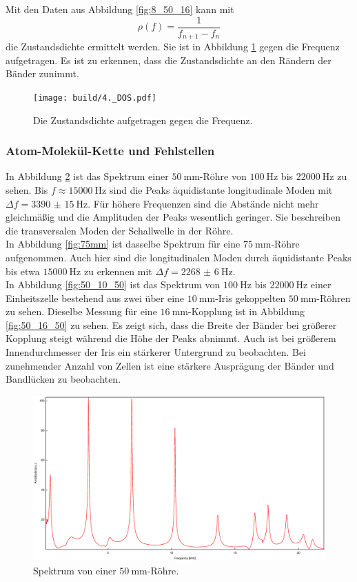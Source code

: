 \newpage
\noindent Mit den Daten aus Abbildung \ref{fig:8_50_16} kann mit
\[
\rho(f) = \frac{1}{f_{n+1}-f_n}
\]
die Zustandsdichte ermittelt werden. Sie ist in Abbildung \ref{fig:DOS} gegen die Frequenz aufgetragen. Es ist zu erkennen, dass die Zustandsdichte an den Rändern der Bänder zunimmt.

\begin{figure}
\centering
\texttt{[image: build/4.\_DOS.pdf]}
\caption{Die Zustandsdichte aufgetragen gegen die Frequenz.}
\label{fig:DOS}
\end{figure}

\subsubsection{Atom-Molekül-Kette und Fehlstellen}

In Abbildung \ref{fig:50mm} ist das Spektrum einer $\SI{50}{\milli\meter}$-Röhre von $\SI{100}{\hertz}$ bis $\SI{22000}{\hertz}$ zu sehen. Bis $f\approx\SI{15000}{\hertz}$
sind die Peaks äquidistante longitudinale Moden mit $\Delta f=\SI{3390(15)}{\hertz}$. Für höhere Frequenzen sind die Abstände nicht mehr gleichmäßig und die Amplituden der Peaks wesentlich geringer. Sie beschreiben die transversalen Moden der Schallwelle in der Röhre.\\
In Abbildung \ref{fig:75mm} ist dasselbe Spektrum für eine $\SI{75}{\milli\meter}$-Röhre aufgenommen. Auch hier sind die longitudinalen Moden durch äquidistante Peaks bis etwa $\SI{15000}{\hertz}$ zu erkennen mit $\Delta f=\SI{2268(6)}{\hertz}$.\\
In Abbildung \ref{fig:50_10_50} ist das Spektrum von $\SI{100}{\hertz}$ bis $\SI{22000}{\hertz}$ einer Einheitszelle bestehend aus zwei über eine $\SI{10}{\milli\meter}$-Iris gekoppelten $\SI{50}{\milli\meter}$-Röhren zu sehen. Dieselbe Messung für eine $\SI{16}{\milli\meter}$-Kopplung ist in Abbildung \ref{fig:50_16_50} zu sehen. Es zeigt sich, dass die Breite der Bänder bei größerer Kopplung steigt während die Höhe der Peaks abnimmt. Auch ist bei größerem Innendurchmesser der Iris ein stärkerer Untergrund zu beobachten.
Bei zunehmender Anzahl von Zellen ist eine stärkere Ausprägung der Bänder und Bandlücken zu beobachten.

\begin{figure}
\centering
\includegraphics[width=\linewidth-60pt,height=\textheight-60pt,keepaspectratio]{FP-V23data/4.6_50mm.eps}
\caption{Spektrum von einer $\SI{50}{\milli\meter}$-Röhre.}
\label{fig:50mm}
\end{figure}

